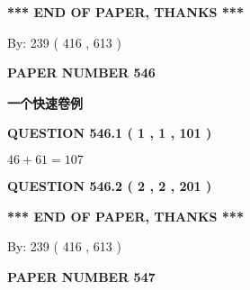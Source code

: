 \documentclass{ctexart}
\begin{document}
   
   
\vspace{1.0in} 
{\textbf{\large{ *** END OF PAPER, THANKS *** }}} 
   
   
\hspace{1.0in} By: 
 239 ( 416 ,  613 )
   
   
   
   
\newpage 
\setcounter{page}{ 
   546001 } 
   
   
   
   
 {\textbf{ \Large{ PAPER NUMBER  546  }}}
   
   
\vspace{0.2in}
   
   
   
   
   
   
 \vspace{0.2in}
{\LARGE {\textbf{ 一个快速卷例}}}
   
   
  
\vspace{0.2in}
  
{\textbf{\Large{QUESTION
546.1 
 ( 1 , 1 , 101 )
}}}
  
  
 
 

$ %
46 +  %
61=   %
107$
 
 
  
\vspace{0.2in}
  
{\textbf{\Large{QUESTION
546.2 
 ( 2 , 2 , 201 )
}}}
  
  
   
   
 \vspace{0.2in}
 
   
   
   
   
\vspace{1.0in} 
{\textbf{\large{ *** END OF PAPER, THANKS *** }}} 
   
   
\hspace{1.0in} By: 
 239 ( 416 ,  613 )
   
   
   
   
\newpage 
\setcounter{page}{ 
   547001 } 
   
   
   
   
 {\textbf{ \Large{ PAPER NUMBER  547  }}}
   
   
\vspace{0.2in}
   
\end{document}
